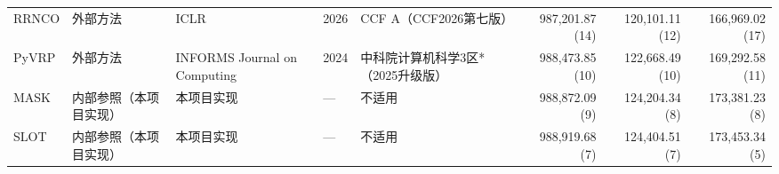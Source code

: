 \begin{table}[t]
\begin{tabular}{lllllrrr}
RRNCO & 外部方法 & ICLR & 2026 & CCF A（CCF2026第七版） & 987,201.87 (14) & 120,101.11 (12) & 166,969.02 (17) \\
PyVRP & 外部方法 & INFORMS Journal on Computing & 2024 & 中科院计算机科学3区*（2025升级版） & 988,473.85 (10) & 122,668.49 (10) & 169,292.58 (11) \\
MASK & 内部参照（本项目实现） & 本项目实现 & — & 不适用 & 988,872.09 (9) & 124,204.34 (8) & 173,381.23 (8) \\
SLOT & 内部参照（本项目实现） & 本项目实现 & — & 不适用 & 988,919.68 (7) & 124,404.51 (7) & 173,453.34 (5) \\
\bottomrule
\end{tabular}
\end{table}
